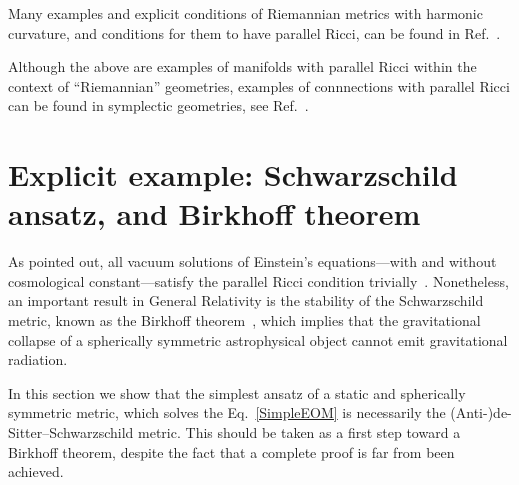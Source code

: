 Many examples and explicit conditions of Riemannian metrics with harmonic curvature, and conditions for them to have parallel Ricci, can be found in Ref.~\cite{derdzinski1988riemannian}.

Although the above are examples of manifolds with parallel Ricci within the context of ``Riemannian'' geometries, examples of connnections with parallel Ricci can be found in symplectic geometries, see Ref.~\cite{cahen2000symplectic}. 


\section{\label{Schw}Explicit example: Schwarzschild ansatz, and Birkhoff theorem}



As pointed out, all vacuum solutions of Einstein's equations---with and without cosmological constant---satisfy the parallel Ricci condition trivially~\cite{bourguignon1981varietes}. Nonetheless, an important result in General Relativity is the stability of the Schwarzschild metric, known as the Birkhoff theorem~\cite{Jebsen1921,Birkhoff1923,Alexandrow1923,Eisland1925}, which implies that the gravitational collapse of a spherically symmetric astrophysical object cannot emit gravitational radiation. 

In this section we show that the simplest ansatz of a static and spherically symmetric metric, which solves the Eq.~\eqref{SimpleEOM} is necessarily the (Anti-)de-Sitter--Schwarzschild metric. This should be taken as a first step toward a Birkhoff theorem, despite the fact that a complete proof is far from been achieved.

